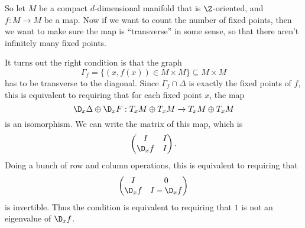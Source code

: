 \documentclass[a4paper]{article}
\theoremstyle{definition}
\begin{document}
So let $M$ be a compact $d$-dimensional manifold that is $\Z$-oriented, and $f: M \to M$ be a map. Now if we want to count the number of fixed points, then we want to make sure the map is ``transverse'' in some sense, so that there aren't infinitely many fixed points.

It turns out the right condition is that the graph
\[
  \Gamma_f = \{(x, f(x)) \in M \times M\} \subseteq M \times M
\]
has to be transverse to the diagonal. Since $\Gamma_f \cap \Delta$ is exactly the fixed points of $f$, this is equivalent to requiring that for each fixed point $x$, the map
\[
  \D_x \Delta \oplus \D_x F: T_x M \oplus T_x M \to T_x M \oplus T_x M
\]
is an isomorphism. We can write the matrix of this map, which is
\[
  \begin{pmatrix}
    I & I\\
    \D_x f & I
  \end{pmatrix}.
\]
Doing a bunch of row and column operations, this is equivalent to requiring that
\[
  \begin{pmatrix}
    I & 0\\
    \D_x f & I - \D_x f
  \end{pmatrix}
\]
is invertible. Thus the condition is equivalent to requiring that $1$ is not an eigenvalue of $\D_x f$.
\end{document}
